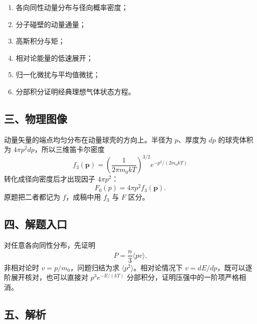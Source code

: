 \documentclass[12pt,a4paper,UTF8]{ctexart}
\newcommand{\tightlist}{\setlength{\itemsep}{0pt}\setlength{\parskip}{0pt}}
\begin{document}
\begin{enumerate}
\def\labelenumi{\arabic{enumi}.}
\tightlist
\item
  各向同性动量分布与径向概率密度；
\item
  分子碰壁的动量通量；
\item
  高斯积分与矩；
\item
  相对论能量的低速展开；
\item
  归一化微扰与平均值微扰；
\item
  分部积分证明经典理想气体状态方程。
\end{enumerate}

\subsection{三、物理图像}\label{ux4e09ux7269ux7406ux56feux50cf-7}

动量矢量的端点均匀分布在动量球壳的方向上。半径为 \(p\)、厚度为 \(dp\)
的球壳体积为 \(4\pi p^2dp\)，所以三维笛卡尔密度 \[
f_3(\boldsymbol p)
=\left(\frac1{2\pi m_0kT}\right)^{3/2}
e^{-p^2/(2m_0kT)}
\] 转化成径向密度后才出现因子 \(4\pi p^2\)： \[
F_0(p)=4\pi p^2f_3(\boldsymbol p).
\] 原题把二者都记为 \(f\)，成稿中用 \(f_3\) 与 \(F\) 区分。

\subsection{四、解题入口}\label{ux56dbux89e3ux9898ux5165ux53e3-7}

对任意各向同性分布，先证明 \[
\boxed{
P=\frac n3\langle pv\rangle
}. \tag{1}
\] 非相对论时 \(v=p/m_0\)，问题归结为求
\(\langle p^2\rangle\)。相对论情况下
\(v=dE/dp\)，既可以逐阶展开核对，也可以直接对 \(p^3e^{-E/(kT)}\)
分部积分，证明压强中的一阶项严格相消。

\subsection{五、解析}\label{ux4e94ux89e3ux6790-7}
\end{document}
